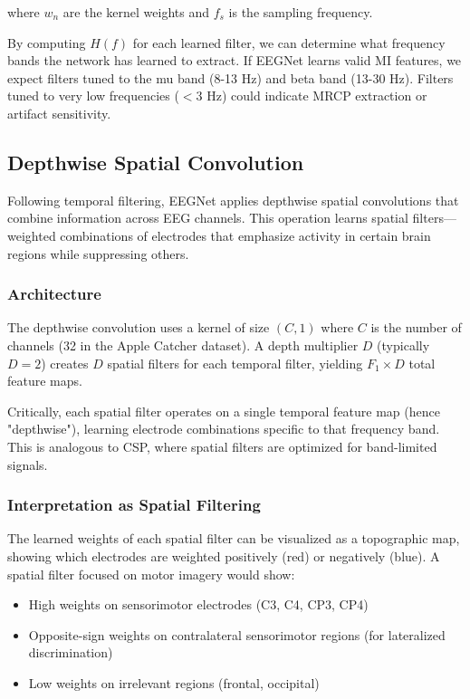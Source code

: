 where $w_n$ are the kernel weights and $f_s$ is the sampling frequency.

By computing $H(f)$ for each learned filter, we can determine what frequency bands the network has learned to extract. If EEGNet learns valid MI features, we expect filters tuned to the mu band (8-13 Hz) and beta band (13-30 Hz). Filters tuned to very low frequencies ($<$3 Hz) could indicate MRCP extraction or artifact sensitivity.


\subsection{Depthwise Spatial Convolution}
\label{subsec:bg_eegnet_spatial}

Following temporal filtering, EEGNet applies depthwise spatial convolutions that combine information across EEG channels. This operation learns spatial filters—weighted combinations of electrodes that emphasize activity in certain brain regions while suppressing others.

\subsubsection{Architecture}

The depthwise convolution uses a kernel of size $(C, 1)$ where $C$ is the number of channels (32 in the Apple Catcher dataset). A depth multiplier $D$ (typically $D = 2$) creates $D$ spatial filters for each temporal filter, yielding $F_1 \times D$ total feature maps.

Critically, each spatial filter operates on a single temporal feature map (hence "depthwise"), learning electrode combinations specific to that frequency band. This is analogous to CSP, where spatial filters are optimized for band-limited signals.

\subsubsection{Interpretation as Spatial Filtering}

The learned weights of each spatial filter can be visualized as a topographic map, showing which electrodes are weighted positively (red) or negatively (blue). A spatial filter focused on motor imagery would show:

\begin{itemize}
    \item High weights on sensorimotor electrodes (C3, C4, CP3, CP4)
    \item Opposite-sign weights on contralateral sensorimotor regions (for lateralized discrimination)
    \item Low weights on irrelevant regions (frontal, occipital)
\end{itemize}

